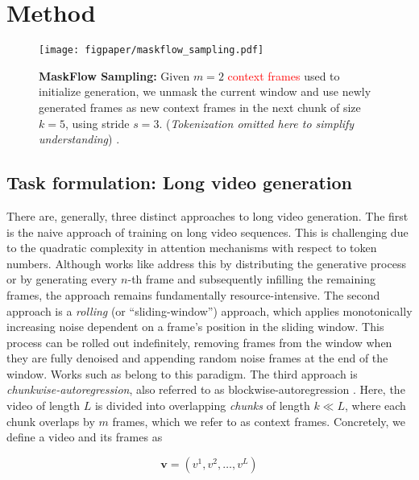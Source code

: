 \section{Method}

\begin{figure*}[ht!]
    \centering
    \texttt{[image: figpaper/maskflow\_sampling.pdf]}
    \vspace{-7pt}
    \caption{\textbf{MaskFlow Sampling:} Given $m=2$ \textcolor{red}{context frames} used to initialize generation, we unmask the current window and use \textcolor{color_generated_frame}{newly generated frames} as new context frames in the next chunk of size $k=5$, using stride $s=3$. (\textit{Tokenization omitted here to simplify understanding}) .
    }
    \label{fig:sampling}
    \vspace{-10pt}
\end{figure*}

\subsection{Task formulation: Long video generation}
\label{subsec:long_vid}

 There are, generally, three distinct approaches to long video generation. The first is the naive approach of training on long video sequences. This is challenging due to the quadratic complexity in attention mechanisms with respect to token numbers. Although works like\cite{tan2024video,harvey2022flexible} address this by distributing the generative process or by generating every \(n\)-th frame and subsequently infilling the remaining frames, the approach remains fundamentally resource-intensive. The second approach is a \emph{rolling} (or ``sliding-window'') approach, which applies monotonically increasing noise dependent on a frame's position in the sliding window. This process can be rolled out indefinitely, removing frames from the window when they are fully denoised and appending random noise frames at the end of the window. Works such as \cite{ruhe2024rollingdiffusionmodels, wu2023ar, xie2024progressive} belong to this paradigm. The third approach is \emph{chunkwise-autoregression}, also referred to as blockwise-autoregression \cite{ruhe2024rollingdiffusionmodels}. Here, the video of length $L$ is divided into overlapping \emph{chunks} of length $k \ll L$, where each chunk overlaps by $m$ frames, which we refer to as context frames. Concretely, we define a video and its frames as

\begin{equation}
   \mathbf{v} = (v^1, v^2, \dots, v^L)
\end{equation}

